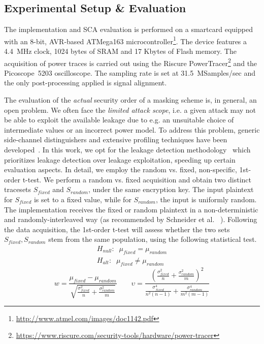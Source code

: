 \subsection{Experimental Setup \& Evaluation}
The implementation and SCA evaluation is performed on a smartcard equipped with an 8-bit, AVR-based ATMega163 microcontroller\footnote{\url{http://www.atmel.com/images/doc1142.pdf}}. 
The device features a 4.4~MHz clock, 1024 bytes of SRAM and 17 Kbytes of Flash memory. 
The acquisition of power traces is carried out using the Riscure PowerTracer\footnote{\url{https://www.riscure.com/security-tools/hardware/power-tracer}} and the Picoscope~5203 oscilloscope. The sampling rate is set at 31.5~MSamples/sec and the only post-processing applied is signal alignment.

The evaluation of the \emph{actual} security order of a masking scheme is, in general, an open problem. We often face the \emph{limited attack scope}, i.e. a given attack may not be able to exploit the available leakage due to e.g. an unsuitable choice of intermediate values or an incorrect power model. To address this problem, generic side-channel distinguishers and extensive profiling techniques have been developed~\cite{DBLP:journals/joc/BatinaGPRSV11,DBLP:conf/cardis/WhitnallOM11,DBLP:conf/eurocrypt/StandaertMY09}. In this work, we opt for the
leakage detection methodology~\cite{tvla} which prioritizes leakage detection over leakage exploitation, speeding up certain evaluation aspects. In detail, we employ the random vs. fixed, non-specific, 1st-order t-test. We perform a random vs. fixed acquisition and obtain two distinct tracesets $S_{fixed}$ and $S_{random}$, under the same encryption key. The input plaintext for $S_{fixed}$ is set to a fixed value, while for $S_{random}$, the input is uniformly random. The implementation receives the fixed or random plaintext in a non-deterministic and randomly-interleaved way (as recommended by Schneider et al. ~\cite{DBLP:conf/ches/SchneiderM15}). Following the data acquisition, the 1st-order t-test will assess whether the two sets $S_{fixed},S_{random}$ stem from the same population, using the following statistical test.
\begin{equation}
\begin{split}
H_{null}: \;\; \mu_{fixed} = \mu_{random} \\
H_{alt}: \;\; \mu_{fixed} \neq \mu_{random}
\end{split}
\end{equation}
\begin{equation}
w = \frac {\mu_{fixed} - \mu_{random}} {\sqrt{ \frac{\sigma_{fixed}^2}{n} + \frac{\sigma_{random}^2}   {m}  }  } \qquad \upsilon = \frac { (\frac{\sigma_{fixed}^2} {n}   + \frac{\sigma_{random}^2} {m}) ^2  } {\frac{\sigma_{fixed}^4} {n^2(n-1)} + \frac{\sigma_{random}^4} {m^2(m-1)}  }
\end{equation}



